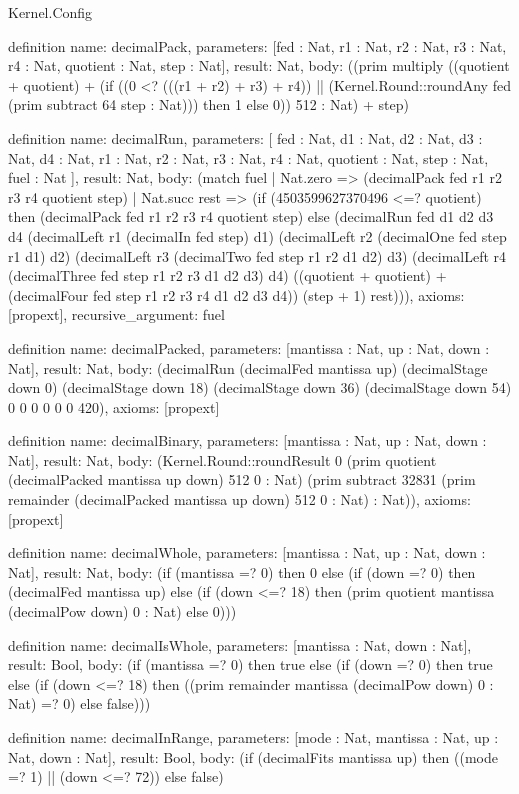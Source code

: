 \begin{lexlean}{Kernel.Config}
\begin{semanticmodule}
definition{
  name: decimalPack,
  parameters: [fed : Nat, r1 : Nat, r2 : Nat, r3 : Nat, r4 : Nat, quotient : Nat, step : Nat],
  result: Nat,
  body: ((prim multiply ((quotient + quotient) + (if ((0 <? (((r1 + r2) + r3) + r4)) || (Kernel.Round::roundAny fed (prim subtract 64 step : Nat))) then 1 else 0)) 512 : Nat) + step)
}

definition{
  name: decimalRun,
  parameters: [
    fed : Nat,
    d1 : Nat,
    d2 : Nat,
    d3 : Nat,
    d4 : Nat,
    r1 : Nat,
    r2 : Nat,
    r3 : Nat,
    r4 : Nat,
    quotient : Nat,
    step : Nat,
    fuel : Nat
  ],
  result: Nat,
  body: (match fuel
    | Nat.zero => (decimalPack fed r1 r2 r3 r4 quotient step)
    | Nat.succ rest => (if (4503599627370496 <=? quotient) then (decimalPack fed r1 r2 r3 r4 quotient step) else (decimalRun fed d1 d2 d3 d4 (decimalLeft r1 (decimalIn fed step) d1) (decimalLeft r2 (decimalOne fed step r1 d1) d2) (decimalLeft r3 (decimalTwo fed step r1 r2 d1 d2) d3) (decimalLeft r4 (decimalThree fed step r1 r2 r3 d1 d2 d3) d4) ((quotient + quotient) + (decimalFour fed step r1 r2 r3 r4 d1 d2 d3 d4)) (step + 1) rest))),
  axioms: [propext],
  recursive_argument: fuel
}

definition{
  name: decimalPacked,
  parameters: [mantissa : Nat, up : Nat, down : Nat],
  result: Nat,
  body: (decimalRun (decimalFed mantissa up) (decimalStage down 0) (decimalStage down 18) (decimalStage down 36) (decimalStage down 54) 0 0 0 0 0 0 420),
  axioms: [propext]
}

definition{
  name: decimalBinary,
  parameters: [mantissa : Nat, up : Nat, down : Nat],
  result: Nat,
  body: (Kernel.Round::roundResult 0 (prim quotient (decimalPacked mantissa up down) 512 0 : Nat) (prim subtract 32831 (prim remainder (decimalPacked mantissa up down) 512 0 : Nat) : Nat)),
  axioms: [propext]
}

definition{
  name: decimalWhole,
  parameters: [mantissa : Nat, up : Nat, down : Nat],
  result: Nat,
  body: (if (mantissa =? 0) then 0 else (if (down =? 0) then (decimalFed mantissa up) else (if (down <=? 18) then (prim quotient mantissa (decimalPow down) 0 : Nat) else 0)))
}

definition{
  name: decimalIsWhole,
  parameters: [mantissa : Nat, down : Nat],
  result: Bool,
  body: (if (mantissa =? 0) then true else (if (down =? 0) then true else (if (down <=? 18) then ((prim remainder mantissa (decimalPow down) 0 : Nat) =? 0) else false)))
}

definition{
  name: decimalInRange,
  parameters: [mode : Nat, mantissa : Nat, up : Nat, down : Nat],
  result: Bool,
  body: (if (decimalFits mantissa up) then ((mode =? 1) || (down <=? 72)) else false)
}


\end{semanticmodule}
\end{lexlean}
